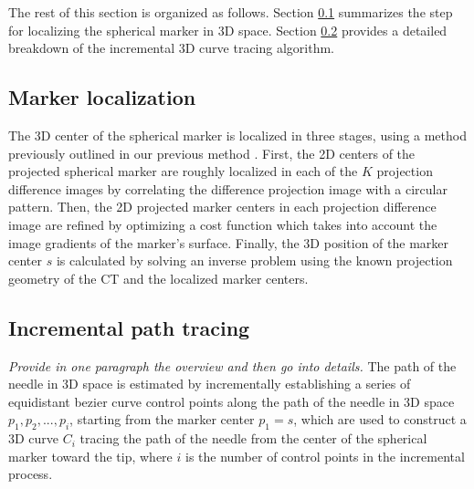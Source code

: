 \documentclass[letterpaper, 11 pt, conference]{ieeeconf}  %
\begin{document}
The rest of this section is organized as follows.
Section \ref{markerloc} summarizes the step for localizing the spherical marker in 3D space.
Section \ref{inctracing} provides a detailed breakdown of the incremental 3D curve tracing algorithm.

\subsection{Marker localization} \label{markerloc}
The 3D center of the spherical marker is localized in three stages, using a method previously outlined in our previous method \cite{medan2017reduced}. 
First, the 2D centers of the projected spherical marker are roughly localized in each of the $K$ projection difference images by correlating the difference projection image with a circular pattern. 
Then, the 2D projected marker centers in each projection difference image are refined by optimizing a cost function which takes into account the image gradients of the marker's surface.
Finally, the 3D position of the marker center $s$ is calculated by solving an inverse problem using the known projection geometry of the CT and the localized marker centers.

\subsection{Incremental path tracing} \label{inctracing}

\textit{Provide in one paragraph the overview and then go into details.}
The path of the needle in 3D space is estimated by incrementally establishing a series of equidistant bezier curve control points along the path of the needle in 3D space $p_1, p_2, ..., p_i$, starting from the marker center $p_1=s$, which are used to construct a 3D curve $C_i$ tracing the path of the needle from the center of the spherical marker toward the tip, where $i$ is the number of control points in the incremental process. 
\end{document}
